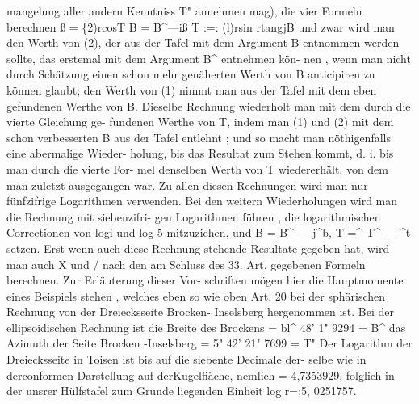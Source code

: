 \documentclass[12pt,a4paper]{article}
\begin{document}
mangelung  aller  andern  Kenntniss  T"  annehmen  mag),  die  vier  Formeln  berechnen ß  =  \{2)rcosT B  =  B\^{}---iß T   :=:  (l)rsin  rtangjB und  zwar  wird  man  den  Werth  von  (2),  der  aus  der  Tafel  mit  dem  Argument  B entnommen  werden  sollte,  das  erstemal  mit  dem  Argument  B\^{}  entnehmen  kön- nen ,  wenn  man  nicht  durch  Schätzung  einen  schon  mehr  genäherten  Werth  von B  anticipiren  zu  können  glaubt;  den  Werth  von  (1)  nimmt  man  aus  der  Tafel mit  dem  eben  gefundenen  Werthe  von  B. Dieselbe  Rechnung  wiederholt  man  mit  dem  durch  die  vierte  Gleichung  ge- fundenen Werthe  von  T,  indem  man  (1)  und  (2)  mit  dem  schon  verbesserten  B aus  der  Tafel  entlehnt ;  und  so  macht  man  nöthigenfalls  eine  abermalige  Wieder- holung, bis  das  Resultat  zum  Stehen  kommt,  d.  i.  bis  man  durch  die  vierte  For- mel denselben  Werth  von  T  wiedererhält,  von  dem  man  zuletzt  ausgegangen  war. Zu  allen  diesen  Rechnungen  wird  man  nur  fünfzifrige  Logarithmen  verwenden. Bei  den  weitern  Wiederholungen  wird  man  die  Rechnung  mit  siebenzifri- gen  Logarithmen  führen ,  die  logarithmischen  Correctionen  von  logi  und  log  5 mitzuziehen,  und  B  =  B\^{}  ---  j\^{}b,  T  =\^{}  T\^{}  ---  \^{}t  setzen.  Erst  wenn  auch  diese Rechnung  stehende  Resultate  gegeben  hat,  wird  man  auch  X  und  /  nach  den  am Schluss  des  33.  Art.  gegebenen  Formeln  berechnen.  Zur  Erläuterung  dieser  Vor- schriften mögen  hier  die  Hauptmomente  eines  Beispiels  stehen ,  welches  eben  so wie  oben  Art.  20  bei  der  sphärischen  Rechnung  von  der  Dreiecksseite  Brocken- Inselsberg  hergenommen  ist. Bei  der  ellipsoidischen  Rechnung  ist  die  Breite  des  Brockens =  bl\^{}  48'      1"  9294  =  B\^{} das  Azimuth  der  Seite  Brocken -Inselsberg =     5"   42'   21"   7699  =  T" Der  Logarithm  der  Dreiecksseite  in  Toisen  ist  bis  auf  die  siebente  Decimale  der- selbe wie  in  derconformen  Darstellung  auf  derKugelfiäche,  nemlich  =  4,7353929, folglich  in  der  unsrer  Hülfstafel  zum  Grunde  liegenden  Einheit  log  r=:5, 0251757.
\end{document}
